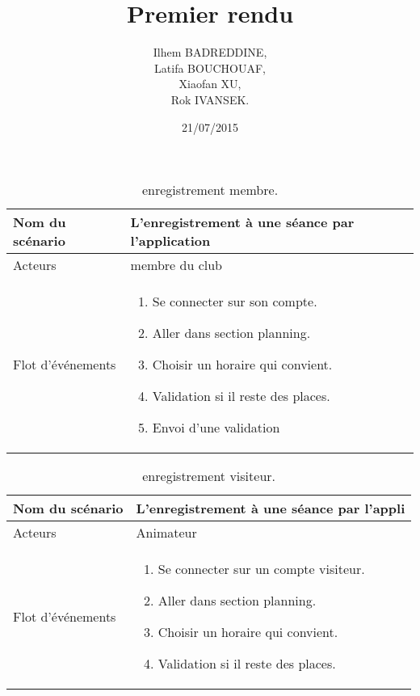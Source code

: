 \documentclass{report}
\title{Premier rendu }
\author{Ilhem BADREDDINE,\\ Latifa BOUCHOUAF, \\ Xiaofan XU, \\ Rok IVANSEK.}
\date{21/07/2015}
\begin{document}
\begin{table}[htbp]
\begin{center}
\begin{tabular}{|L{4cm}||L{10cm}|}
\hline Nom du scénario & L'enregistrement à une séance par l'application    \\
\hline  Acteurs &  membre du club \\
\hline  Flot d'événements &  \begin{enumerate}
\item Se connecter sur son compte.
\item Aller dans section planning.
\item Choisir un horaire qui convient.
\item Validation si il reste des places.
\item Envoi d'une validation
\end{enumerate} \\
\hline
\end{tabular}
\caption{enregistrement membre.\label{engmembre}}
\end{center}
\end{table}

\begin{table}[htbp]
\begin{center}
\begin{tabular}{|L{4cm}||L{10cm}|}
\hline Nom du scénario & L'enregistrement à une séance par l'appli    \\
\hline  Acteurs &  Animateur \\
\hline  Flot d'événements &  \begin{enumerate}
\item Se connecter sur un compte visiteur.
\item Aller dans section planning.
\item Choisir un horaire qui convient.
\item Validation si il reste des places.
\end{enumerate}\\
\hline
\end{tabular}
\caption{enregistrement visiteur.\label{engvisit}}
\end{center}
\end{table}
\end{document}

